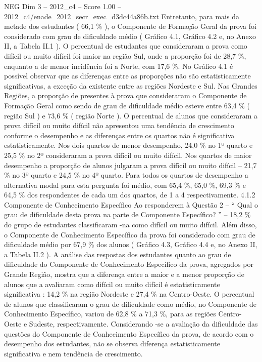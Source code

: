 \begin{textsample}{NEG Dim 3 – 2012\_c4 – Score 1.00 – 2012\_c4/enade\_2012\_secr\_exec\_d3dc44a86b.txt}
Entretanto, para mais da metade dos estudantes ( 66,1 \% ), o Componente de Formação Geral da prova foi considerado com grau de dificuldade médio ( Gráfico 4.1, Gráfico 4.2 e, no Anexo II, a Tabela II.1 ).
O percentual de estudantes que consideraram a prova como difícil ou muito difícil foi maior na região Sul, onde a proporção foi de 28,7 \%, enquanto a de menor incidência foi a Norte, com 17,6 \%.
No Gráfico 4.1 é possível observar que as diferenças entre as proporções não são estatisticamente significativas, a exceção da existente entre as regiões Nordeste e Sul.
Nas Grandes Regiões, a proporção de presentes à prova que consideraram o Componente de Formação Geral como sendo de grau de dificuldade médio esteve entre 63,4 \% ( região Sul ) e 73,6 \% ( região Norte ).
O percentual de alunos que consideraram a prova difícil ou muito difícil não apresentou uma tendência de crescimento conforme o desempenho e as diferenças entre os quartos não é significativa estatisticamente.
Nos dois quartos de menor desempenho, 24,0 \% no 1º quarto e 25,5 \% no 2º consideraram a prova difícil ou muito difícil.
Nos quartos de maior desempenho a proporção de alunos julgaram a prova difícil ou muito difícil – 21,7 \% no 3º quarto e 24,5 \% no 4º quarto.
Para todos os quartos de desempenho a alternativa modal para esta pergunta foi médio, com 65,4 \%, 65,0 \%, 69,3 \% e 64,5 \% dos respondentes de cada um dos quartos, de 1 a 4 respectivamente. 4.1.2 Componente de Conhecimento Específico Ao responderem à Questão 2 – “ Qual o grau de dificuldade desta prova na parte de Componente Específico? ” – 18,2 \% do grupo de estudantes classificaram -na como difícil ou muito difícil.
Além disso, o Componente de Conhecimento Específico da prova foi considerado com grau de dificuldade médio por 67,9 \% dos alunos ( Gráfico 4.3, Gráfico 4.4 e, no Anexo II, a Tabela II.2 ).
A análise das respostas dos estudantes quanto ao grau de dificuldade do Componente de Conhecimento Específico da prova, agregados por Grande Região, mostra que a diferença entre a maior e a menor proporção de alunos que a avaliaram como difícil ou muito difícil é estatisticamente significativa : 14,2 \% na região Nordeste e 27,4 \% na Centro-Oeste.
O percentual de alunos que classificaram o grau de dificuldade como médio, no Componente de Conhecimento Específico, variou de 62,8 \% a 71,3 \%, para as regiões Centro-Oeste e Sudeste, respectivamente.
Considerando -se a avaliação da dificuldade das questões do Componente de Conhecimento Específico da prova, de acordo com o desempenho dos estudantes, não se observa diferença estatisticamente significativa e nem tendência de crescimento.

\end{textsample}
